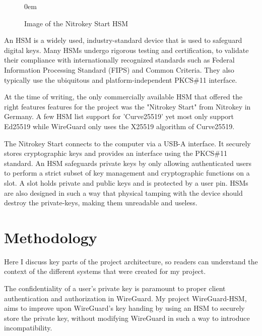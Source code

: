 \documentclass [11pt, proquest] {uwthesis}[2020/02/24]
\begin{document}
\begin{figure}
\centering
\itemsep0em 
\caption{Image of the Nitrokey Start HSM}
\label{img:nitrokey}

\end{figure}
An HSM is a widely used, industry-standard device that is used to safeguard digital keys. Many HSMs undergo rigorous testing and certification, to validate their compliance with internationally recognized standards such as Federal Information Processing Standard (FIPS) and Common Criteria. They also typically use the ubiquitous and platform-independent PKCS\#11 interface. 

At the time of writing, the only commercially available HSM that offered the right features features for the project was the "Nitrokey Start" from Nitrokey in Germany\cite{nitrokey_nitrokey_2022}. A few HSM list support for 'Curve25519' yet most only support Ed25519 while WireGuard only uses the X25519 algorithm of Curve25519.

The Nitrokey Start connects to the computer via a USB-A interface. It securely stores cryptographic keys and provides an interface using the PKCS\#11 standard.
An HSM safeguards private keys by only allowing authenticated users to perform a strict subset of key management and cryptographic functions on a slot. A slot holds private and public keys and is protected by a user pin. HSMs are also designed in such a way that physical tamping with the device should destroy the private-keys, making them unreadable and useless. 


\chapter {Methodology}
Here I discuss key parts of the project architecture, so readers can understand the context of the different systems that were created for my project.

The confidentiality of a user's private key is paramount to proper client authentication and authorization in WireGuard. My project WireGuard-HSM, aims to improve upon WireGuard's key handing by using an HSM to securely store the private key, without modifying WireGuard in such a way to introduce incompatibility.
\end{document}

